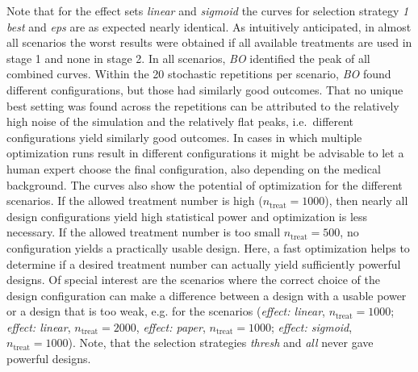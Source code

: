 \documentclass[bimj,fleqn]{w-art}
\theoremstyle{plain}
\theoremstyle{definition}
\begin{document}
Note that for the effect sets \emph{linear} and \emph{sigmoid} the curves for selection strategy \emph{1 best} and \emph{eps} are as expected nearly identical.
As intuitively anticipated, in almost all scenarios the worst results were obtained if all available treatments are used in stage 1 and none in stage 2. 
In all scenarios, \emph{BO} identified the peak of all combined curves.
Within the 20 stochastic repetitions per scenario, \emph{BO} found different configurations, but those had similarly good outcomes.
That no unique best setting was found across the repetitions can be attributed to the relatively high noise of the simulation and the relatively flat peaks, i.e.\ different configurations yield similarly good outcomes.
In cases in which multiple optimization runs result in different configurations it might be advisable to let a human expert choose the final configuration, also depending on the medical background.
The curves also show the potential of optimization for the different scenarios.
If the allowed treatment number is high ($n_{\text{treat}} = 1000$), then nearly all design configurations yield high statistical power and optimization is less necessary.
If the allowed treatment number is too small $n_{\text{treat}} = 500$, no configuration yields a practically usable design.
Here, a fast optimization helps to determine if a desired treatment number can actually yield sufficiently powerful designs.
Of special interest are the scenarios where the correct choice of the design configuration can make a difference between a design with a usable power or a design that is too weak, e.g. for the scenarios (\emph{effect: linear}, $n_{\text{treat}} = 1000$; \emph{effect: linear}, $n_{\text{treat}} = 2000$, \emph{effect: paper}, $n_{\text{treat}} = 1000$; \emph{effect: sigmoid}, $n_{\text{treat}} = 1000$).
Note, that the selection strategies \emph{thresh} and \emph{all} never gave powerful designs.


\end{document}
